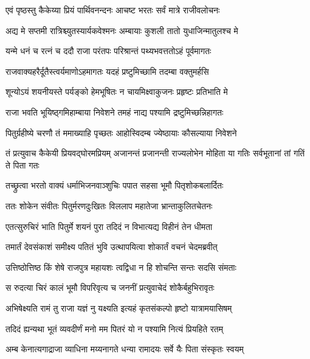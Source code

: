 \twolineshloka
{एवं पृष्ठस्तु कैकेय्या प्रियं पार्थिवनन्दनः}
{आचष्ट भरतः सर्वं मात्रे राजीवलोचनः} %

\twolineshloka
{अद्य मे सप्तमी रात्रिश्च्युतस्यार्यकवेश्मनः}
{अम्बायाः कुशली तातो युधाजिन्मातुलश्च मे} %

\twolineshloka
{यन्मे धनं च रत्नं च ददौ राजा परंतपः}
{परिश्रान्तं पथ्यभवत्ततोऽहं पूर्वमागतः} %

\twolineshloka
{राजवाक्यहरैर्दूतैस्त्वर्यमाणोऽहमागतः}
{यदहं प्रष्टुमिच्छामि तदम्बा वक्तुमर्हसि} %

\twolineshloka
{शून्योऽयं शयनीयस्ते पर्यङ्को हेमभूषितः}
{न चायमिक्ष्वाकुजनः प्रहृष्टः प्रतिभाति मे} %

\twolineshloka
{राजा भवति भूयिष्ठ्गमिहाम्बाया निवेशने}
{तमहं नाद्य पश्यामि द्रष्टुमिच्छन्निहागतः} %

\twolineshloka
{पितुर्ग्रहीष्ये चरणौ तं ममाख्याहि पृच्छतः}
{आहोस्विदम्ब ज्येष्ठायाः कौसल्याया निवेशने} %

\threelineshloka
{तं प्रत्युवाच कैकेयी प्रियवद्घोरमप्रियम्}
{अजानन्तं प्रजानन्ती राज्यलोभेन मोहिता}
{या गतिः सर्वभूतानां तां गतिं ते पिता गतः} %

\twolineshloka
{तच्छ्रुत्वा भरतो वाक्यं धर्माभिजनवाञ्शुचिः}
{पपात सहसा भूमौ पितृशोकबलार्दितः} %

\twolineshloka
{ततः शोकेन संवीतः पितुर्मरणदुःखितः}
{विललाप महातेजा भ्रान्ताकुलितचेतनः} %

\twolineshloka
{एतत्सुरुचिरं भाति पितुर्मे शयनं पुरा}
{तदिदं न विभात्यद्य विहीनं तेन धीमता} %

\twolineshloka
{तमार्तं देवसंकाशं समीक्ष्य पतितं भुवि}
{उत्थापयित्वा शोकार्तं वचनं चेदमब्रवीत्} %

\twolineshloka
{उत्तिष्ठोत्तिष्ठ किं शेषे राजपुत्र महायशः}
{त्वद्विधा न हि शोचन्ति सन्तः सदसि संमताः} %

\twolineshloka
{स रुदत्या चिरं कालं भूमौ विपरिवृत्य च}
{जननीं प्रत्युवाचेदं शोकैर्बहुभिरावृतः} %

\twolineshloka
{अभिषेक्ष्यति रामं तु राजा यज्ञं नु यक्ष्यति}
{इत्यहं कृतसंकल्पो हृष्टो यात्रामयासिषम्} %

\twolineshloka
{तदिदं ह्यन्यथा भूतं व्यवदीर्णं मनो मम}
{पितरं यो न पश्यामि नित्यं प्रियहिते रतम्} %

\twolineshloka
{अम्ब केनात्यगाद्राजा व्याधिना मय्यनागते}
{धन्या रामादयः सर्वे यैः पिता संस्कृतः स्वयम्} %


